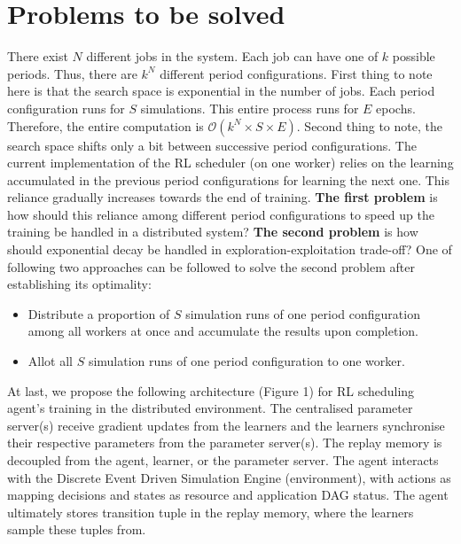 \documentclass[10pt,a4paper]{article}
\begin{document}
\section{Problems to be solved}
\begin{normalsize}
There exist \(N\) different jobs in the system. Each job can have one of \(k\) possible periods. Thus, there are \(k^N\) different period configurations. First thing to note here is that the search space is exponential in the number of jobs. Each period configuration runs for \(S\) simulations. This entire process runs for \(E\) epochs. Therefore, the entire computation is $\mathcal{O}(k^N \times S  \times E)$. Second thing to note, the search space shifts only a bit between successive period configurations. The current implementation of the RL scheduler (on one worker) relies on the learning accumulated in the previous period configurations for learning the next one. This reliance gradually increases towards the end of training. \textbf{The first problem} is how should this reliance among different period configurations to speed up the training be handled in a distributed system? \textbf{The second problem} is how should exponential decay be handled in exploration-exploitation trade-off? One of following two approaches can be followed to solve the second problem after establishing its optimality:
\begin{itemize}
    \item Distribute a proportion of \(S\) simulation runs of one period configuration among all workers at once and accumulate the results upon completion.
    \item Allot all \(S\) simulation runs of one period configuration to one worker. 
\end{itemize}
At last, we propose the following architecture (Figure 1) for RL scheduling agent's training in the distributed environment. The centralised parameter server(s) receive gradient updates from the learners and the learners synchronise their respective parameters from the parameter server(s). The replay memory is decoupled from the agent, learner, or the parameter server. The agent interacts with the Discrete Event Driven Simulation Engine (environment), with actions as mapping decisions and states as resource and application DAG status. The agent ultimately stores transition tuple in the replay memory, where the learners sample these tuples from.
\end{normalsize}



\clearpage


\end{document}
